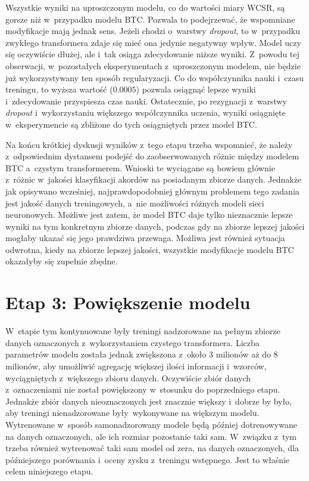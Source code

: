 Wszystkie wyniki na uproszczonym modelu, co do wartości miary WCSR, są gorsze niż w~przypadku modelu BTC. Pozwala to podejrzewać, że wspomniane modyfikacje mają jednak sens. Jeżeli chodzi o~warstwy \emph{dropout}, to w~przypadku zwykłego transformera zdaje się mieć ona jedynie negatywny wpływ. Model uczy się oczywiście dłużej, ale i~tak osiąga zdecydowanie niższe wyniki. Z~powodu tej obserwacji, w~pozostałych eksperymentach z~uproszczonym modelem, nie będzie już wykorzystywany ten sposób regularyzacji. Co do współczynnika nauki i~czasu treningu, to wyższa wartość  ($0.0005$) pozwala osiągnąć lepsze wyniki i~zdecydowanie przyspiesza czas nauki. Ostatecznie, po rezygnacji z~warstwy \emph{dropout} i~wykorzystaniu większego współczynnika uczenia, wyniki osiągnięte w~eksperymencie  są zbliżone do tych osiągniętych przez model BTC.

Na końcu krótkiej dyskusji wyników z~tego etapu trzeba wspomnieć, że należy z~odpowiednim dystansem podejść do zaobserwowanych różnic między modelem BTC a~czystym transformerem. Wnioski te wyciągane są bowiem głównie z~różnic w~jakości klasyfikacji akordów na posiadanym zbiorze danych. Jednakże jak opisywano wcześniej, najprawdopodobniej głównym problemem tego zadania jest jakość danych treningowych, a~nie możliwości różnych modeli sieci neuronowych. Możliwe jest zatem, że model BTC daje tylko nieznacznie lepsze wyniki na tym konkretnym zbiorze danych, podczas gdy na zbiorze lepszej jakości mogłaby ukazać się jego prawdziwa przewaga. Możliwa jest również sytuacja odwrotna, kiedy na zbiorze lepszej jakości, wszystkie modyfikacje modelu BTC okazałyby się zupełnie zbędne.



\section{Etap 3: Powiększenie modelu}

W~etapie tym kontynuowane były treningi nadzorowane na pełnym zbiorze danych oznaczonych z~wykorzystaniem czystego transformera. Liczba parametrów modelu została jednak zwiększona z~około $3$ milionów aż do $8$ milionów, aby umożliwić agregację większej ilości informacji i~wzorców, wyciągniętych z~większego zbioru danych. Oczywiście zbiór danych z~oznaczeniami nie został powiększony w~stosunku do poprzedniego etapu. Jednakże zbiór danych nieoznaczonych jest znacznie większy i~dobrze by było, aby treningi nienadzorowane były wykonywane na większym modelu. Wytrenowane w~sposób samonadzorowany modele będą później dotrenowywane na danych oznaczonych, ale ich rozmiar pozostanie taki sam. W~związku z~tym trzeba również wytrenować taki sam model od zera, na danych oznaczonych, dla późniejszego porównania i~oceny zysku z~treningu wstępnego. Jest to właśnie celem niniejszego etapu.

